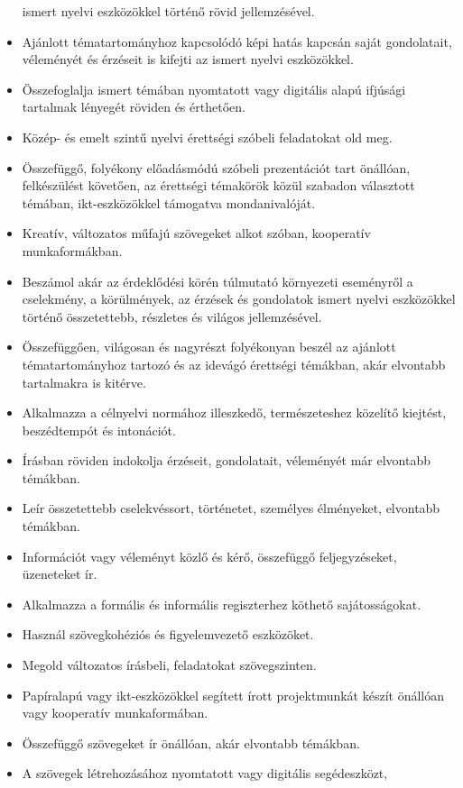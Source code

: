 \begin{itemize}
  ismert nyelvi eszközökkel történő rövid jellemzésével.
\item
  Ajánlott tématartományhoz kapcsolódó képi hatás kapcsán saját
  gondolatait, véleményét és érzéseit is kifejti az ismert nyelvi
  eszközökkel.
\item
  Összefoglalja ismert témában nyomtatott vagy digitális alapú ifjúsági
  tartalmak lényegét röviden és érthetően.
\item
  Közép- és emelt szintű nyelvi érettségi szóbeli feladatokat old meg.
\item
  Összefüggő, folyékony előadásmódú szóbeli prezentációt tart önállóan,
  felkészülést követően, az érettségi témakörök közül szabadon
  választott témában, ikt-eszközökkel támogatva mondanivalóját.
\item
  Kreatív, változatos műfajú szövegeket alkot szóban, kooperatív
  munkaformákban.
\item
  Beszámol akár az érdeklődési körén túlmutató környezeti eseményről a
  cselekmény, a körülmények, az érzések és gondolatok ismert nyelvi
  eszközökkel történő összetettebb, részletes és világos jellemzésével.
\item
  Összefüggően, világosan és nagyrészt folyékonyan beszél az ajánlott
  tématartományhoz tartozó és az idevágó érettségi témákban, akár
  elvontabb tartalmakra is kitérve.
\item
  Alkalmazza a célnyelvi normához illeszkedő, természeteshez közelítő
  kiejtést, beszédtempót és intonációt.
\item
  Írásban röviden indokolja érzéseit, gondolatait, véleményét már
  elvontabb témákban.
\item
  Leír összetettebb cselekvéssort, történetet, személyes élményeket,
  elvontabb témákban.
\item
  Információt vagy véleményt közlő és kérő, összefüggő feljegyzéseket,
  üzeneteket ír.
\item
  Alkalmazza a formális és informális regiszterhez köthető
  sajátosságokat.
\item
  Használ szövegkohéziós és figyelemvezető eszközöket.
\item
  Megold változatos írásbeli, feladatokat szövegszinten.
\item
  Papíralapú vagy ikt-eszközökkel segített írott projektmunkát készít
  önállóan vagy kooperatív munkaformában.
\item
  Összefüggő szövegeket ír önállóan, akár elvontabb témákban.
\item
  A szövegek létrehozásához nyomtatott vagy digitális segédeszközt,

\end{itemize}
